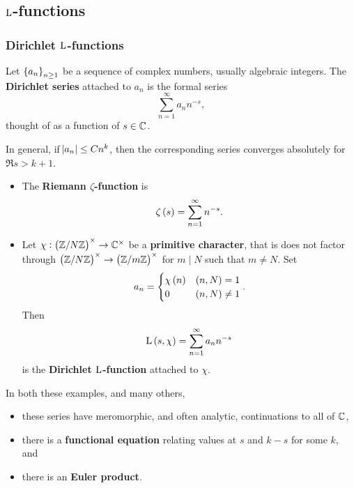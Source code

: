 \subsection{\texorpdfstring{$ \mathrm{L} $}{L}-functions}

\subsubsection{Dirichlet \texorpdfstring{$ \mathrm{L} $}{L}-functions}

\begin{definition}
Let $ \cbr{a_n}_{n \ge 1} $ be a sequence of complex numbers, usually algebraic integers. The \textbf{Dirichlet series} attached to $ a_n $ is the formal series
$$ \sum_{n = 1}^\infty a_nn^{-s}, $$
thought of as a function of $ s \in \mathbb{C} $.
\end{definition}

In general, if $ \abs{a_n} \le Cn^k $, then the corresponding series converges absolutely for $ \Re s > k + 1 $.

\begin{example*}
\hfill
\begin{itemize}
\item The \textbf{Riemann $ \zeta $-function} is
$$ \zeta\br{s} = \sum_{n = 1}^\infty n^{-s}. $$
\item Let $ \chi : \br{\ZZ / N\ZZ}^\times \to \CC^\times $ be a \textbf{primitive character}, that is does not factor through $ \br{\ZZ / N\ZZ}^\times \to \br{\ZZ / m\ZZ}^\times $ for $ m \mid N $ such that $ m \ne N $. Set
$$ a_n =
\begin{cases}
\chi\br{n} & \br{n, N} = 1 \\
0 & \br{n, N} \ne 1
\end{cases}.
$$
Then
$$ \L\br{s, \chi} = \sum_{n = 1}^\infty a_nn^{-s} $$
is the \textbf{Dirichlet $ \mathrm{L} $-function} attached to $ \chi $.
\end{itemize}
\end{example*}

In both these examples, and many others,
\begin{itemize}
\item these series have meromorphic, and often analytic, continuations to all of $ \mathbb{C} $,
\item there is a \textbf{functional equation} relating values at $ s $ and $ k - s $ for some $ k $, and
\item there is an \textbf{Euler product}.
\end{itemize}

